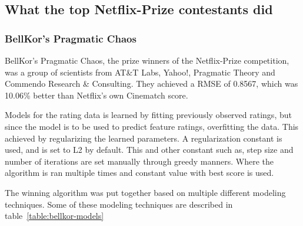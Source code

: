 \subsection{What the top Netflix-Prize contestants did}\label{subsec:thewinners}

\subsubsection{BellKor's Pragmatic Chaos}

BellKor's Pragmatic Chaos, the prize winners of the Netflix-Prize competition, was a group of scientists from AT\&T Labs, Yahoo!, Pragmatic Theory and Commendo Research \& Consulting. They achieved a RMSE of 0.8567, which was 10.06\% better than Netflix's own Cinematch score.

Models for the rating data is learned by fitting previously observed ratings, but since the model is to be used to predict feature ratings, overfitting the data. This achieved by regularizing the learned parameters. A regularization constant is used, and is set to L2 by default. This and other constant such as, step size and number of iterations are set manually through greedy manners. Where the algorithm is ran multiple times and constant value with best score is used. \cite{BellKor-PragmaticTheory}

The winning algorithm was put together based on multiple different modeling techniques. Some of these modeling techniques are described in table~\ref{table:bellkor-models}

